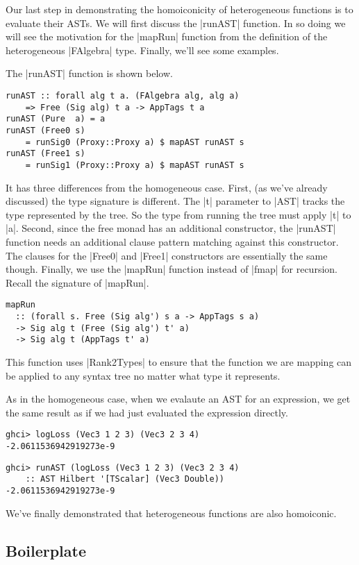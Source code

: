 \documentclass[preprint]{sigplanconf}
\theoremstyle{definition}
\begin{document}
Our last step in demonstrating the homoiconicity of heterogeneous functions is to evaluate their ASTs.
We will first discuss the |runAST| function.
In so doing we will see the motivation for the |mapRun| function from the definition of the heterogeneous |FAlgebra| type.
Finally, we'll see some examples.

The |runAST| function is shown below.
\begin{lstlisting}
runAST :: forall alg t a. (FAlgebra alg, alg a)
    => Free (Sig alg) t a -> AppTags t a
runAST (Pure  a) = a
runAST (Free0 s)
    = runSig0 (Proxy::Proxy a) $ mapAST runAST s
runAST (Free1 s)
    = runSig1 (Proxy::Proxy a) $ mapAST runAST s
\end{lstlisting}
It has three differences from the homogeneous case.
First, (as we've already discussed)
the type signature is different.
The |t| parameter to |AST| tracks the type represented by the tree.
So the type from running the tree must apply |t| to |a|.
Second, since the free monad has an additional constructor,
the |runAST| function needs an additional clause pattern matching against this constructor.
The clauses for the |Free0| and |Free1| constructors are essentially the same though.
Finally, we use the |mapRun| function instead of |fmap| for recursion.
Recall the signature of |mapRun|.
\begin{lstlisting}
mapRun
  :: (forall s. Free (Sig alg') s a -> AppTags s a)
  -> Sig alg t (Free (Sig alg') t' a)
  -> Sig alg t (AppTags t' a)
\end{lstlisting}
This function uses |Rank2Types| to ensure that the function we are mapping can be applied to any syntax tree no matter what type it represents.

As in the homogeneous case,
when we evalaute an AST for an expression,
we get the same result as if we had just evaluated the expression directly.
\begin{lstlisting}
ghci> logLoss (Vec3 1 2 3) (Vec3 2 3 4)
-2.0611536942919273e-9
\end{lstlisting}

\begin{lstlisting}
ghci> runAST (logLoss (Vec3 1 2 3) (Vec3 2 3 4)
    :: AST Hilbert '[TScalar] (Vec3 Double))
-2.0611536942919273e-9
\end{lstlisting}
We've finally demonstrated that heterogeneous functions are also homoiconic.

\subsection{Boilerplate}
\end{document}
